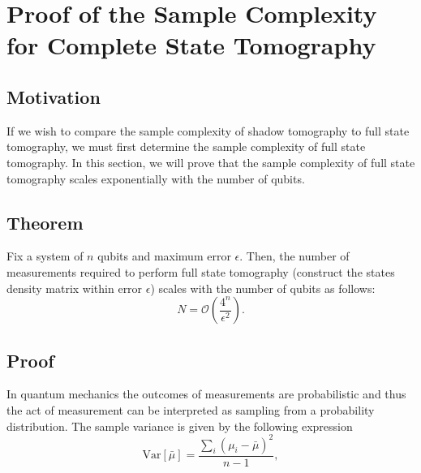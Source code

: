 \documentclass[12pt]{article}
\begin{document}
    
        

    \section{Proof of the Sample Complexity for Complete State Tomography}
    \subsection{Motivation}
    If we wish to compare the sample complexity of shadow tomography to full state tomography, we must first determine the sample complexity of full state tomography. In this section, we will prove that the sample complexity of full state tomography scales exponentially with the number of qubits.

    \subsection{Theorem}
    Fix a system of $n$ qubits and maximum error $\epsilon$. Then, the number of measurements required to perform full state tomography (construct the states density matrix within error $\epsilon$) scales with the number of qubits as follows:
    \begin{equation*}
        N = \mathcal{O}\left(\frac{4^n}{\epsilon^2}\right).
    \end{equation*}

    \subsection{Proof}
    In quantum mechanics the outcomes of measurements are probabilistic and thus the act of measurement can be interpreted as sampling from a probability distribution. The sample variance is given by the following expression
    \begin{equation}
        \text{Var}[\bar{\mu}] = \frac{\sum_i (\mu_i - \bar{\mu})^2}{n-1},
    \end{equation}
\end{document}
